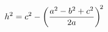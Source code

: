 \documentclass[preview]{standalone}
\begin{document}
\begin{align*}
\special{dvisvgm:raw <g id='unique000'>}h^2 = c^2 - \left(\frac{a^2-b^2+c^2}{2a}\right)^{\!2}\special{dvisvgm:raw </g>}
\end{align*}
\end{document}
